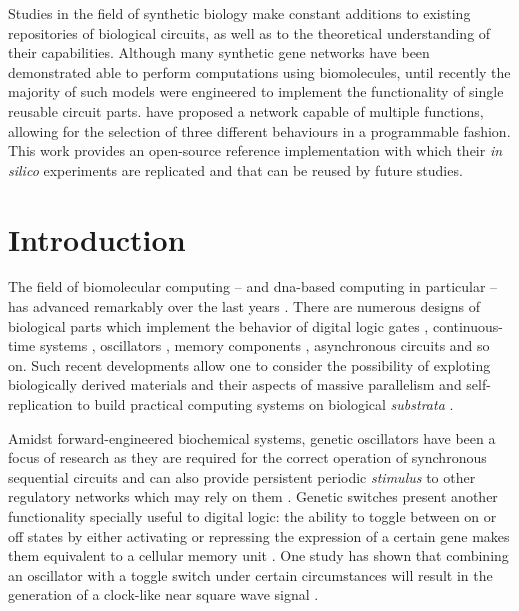 
  \noindent Studies in the field of synthetic biology make constant additions to existing repositories of biological circuits, as well as to the theoretical understanding of their capabilities.
  Although many synthetic gene networks have been demonstrated able to perform computations using biomolecules, until recently the majority of such models were engineered to implement the functionality of single reusable circuit parts.
  \citet{multif} have proposed a network capable of multiple functions, allowing for the selection of three different behaviours in a programmable fashion.
  This work provides an open-source reference implementation with which their \textit{in silico} experiments are replicated and that can be reused by future studies.


\section{Introduction}

  The field of biomolecular computing -- and \acs{dna}-based computing in particular -- has advanced remarkably over the last years \cite{history}.
  There are numerous designs of biological parts which implement the behavior of digital logic gates \cite{reconfgate}, continuous-time systems \cite{analog}, oscillators \cite{repressilator}, memory components \cite{register}, asynchronous circuits \cite{async} and so on.
  Such recent developments allow one to consider the possibility of exploting biologically derived materials and their aspects of massive parallelism and self-replication to build practical computing systems on biological \textit{substrata} \cite{youtuber}.

  Amidst forward-engineered biochemical systems, genetic oscillators have been a focus of research \cite{optoscillator} as they are required for the correct operation of synchronous sequential circuits and can also provide persistent periodic \textit{stimulus} to other regulatory networks which may rely on them \cite{bioapps}.
  Genetic switches present another functionality specially useful \cite{bioapps} to digital logic: the ability to toggle between on or off states by either activating or repressing the expression of a certain gene makes them equivalent to a cellular memory unit \cite{youtuber}.
  One study has shown that combining an oscillator with a toggle switch under certain circumstances will result in the generation of a clock-like near square wave signal \cite{clock}.

